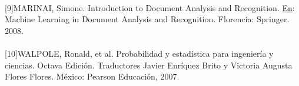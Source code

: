 \paragraph{}
[9]MARINAI, Simone. Introduction to Document Analysis and Recognition. 
\underline{En}: Machine Learning in Document Analysis and Recognition. Florencia: Springer. 2008.
\paragraph{}
[10]WALPOLE, Ronald, et al. Probabilidad y estad\'istica para ingenier\'ia y ciencias. Octava Edici\'on. Traductores Javier Enr\'iquez Brito y Victoria Augusta Flores Flores. M\'exico: Pearson Educaci\'on,  2007.
\pagebreak